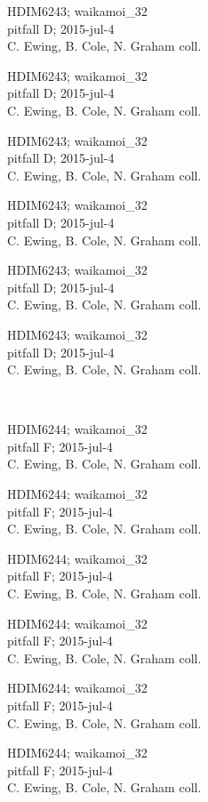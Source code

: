 \documentclass[2pt]{extarticle}
\begin{document}
\noindent
\parbox{0.16\textwidth}{\tiny \raggedright \rule[-0.3\baselineskip]{0pt}{10pt}HDIM6243; waikamoi\_32\\ pitfall D; 2015-jul-4\\ C. Ewing, B. Cole, N. Graham coll.}
\parbox{0.16\textwidth}{\tiny \raggedright \rule[-0.3\baselineskip]{0pt}{10pt}HDIM6243; waikamoi\_32\\ pitfall D; 2015-jul-4\\ C. Ewing, B. Cole, N. Graham coll.}
\parbox{0.16\textwidth}{\tiny \raggedright \rule[-0.3\baselineskip]{0pt}{10pt}HDIM6243; waikamoi\_32\\ pitfall D; 2015-jul-4\\ C. Ewing, B. Cole, N. Graham coll.}
\parbox{0.16\textwidth}{\tiny \raggedright \rule[-0.3\baselineskip]{0pt}{10pt}HDIM6243; waikamoi\_32\\ pitfall D; 2015-jul-4\\ C. Ewing, B. Cole, N. Graham coll.}
\parbox{0.16\textwidth}{\tiny \raggedright \rule[-0.3\baselineskip]{0pt}{10pt}HDIM6243; waikamoi\_32\\ pitfall D; 2015-jul-4\\ C. Ewing, B. Cole, N. Graham coll.}
\parbox{0.16\textwidth}{\tiny \raggedright \rule[-0.3\baselineskip]{0pt}{10pt}HDIM6243; waikamoi\_32\\ pitfall D; 2015-jul-4\\ C. Ewing, B. Cole, N. Graham coll.} \\ 
\vspace{0.001in} 

\noindent
\parbox{0.16\textwidth}{\tiny \raggedright \rule[-0.3\baselineskip]{0pt}{10pt}HDIM6244; waikamoi\_32\\ pitfall F; 2015-jul-4\\ C. Ewing, B. Cole, N. Graham coll.}
\parbox{0.16\textwidth}{\tiny \raggedright \rule[-0.3\baselineskip]{0pt}{10pt}HDIM6244; waikamoi\_32\\ pitfall F; 2015-jul-4\\ C. Ewing, B. Cole, N. Graham coll.}
\parbox{0.16\textwidth}{\tiny \raggedright \rule[-0.3\baselineskip]{0pt}{10pt}HDIM6244; waikamoi\_32\\ pitfall F; 2015-jul-4\\ C. Ewing, B. Cole, N. Graham coll.}
\parbox{0.16\textwidth}{\tiny \raggedright \rule[-0.3\baselineskip]{0pt}{10pt}HDIM6244; waikamoi\_32\\ pitfall F; 2015-jul-4\\ C. Ewing, B. Cole, N. Graham coll.}
\parbox{0.16\textwidth}{\tiny \raggedright \rule[-0.3\baselineskip]{0pt}{10pt}HDIM6244; waikamoi\_32\\ pitfall F; 2015-jul-4\\ C. Ewing, B. Cole, N. Graham coll.}
\parbox{0.16\textwidth}{\tiny \raggedright \rule[-0.3\baselineskip]{0pt}{10pt}HDIM6244; waikamoi\_32\\ pitfall F; 2015-jul-4\\ C. Ewing, B. Cole, N. Graham coll.} \\ 
\vspace{0.001in} 
\end{document}
